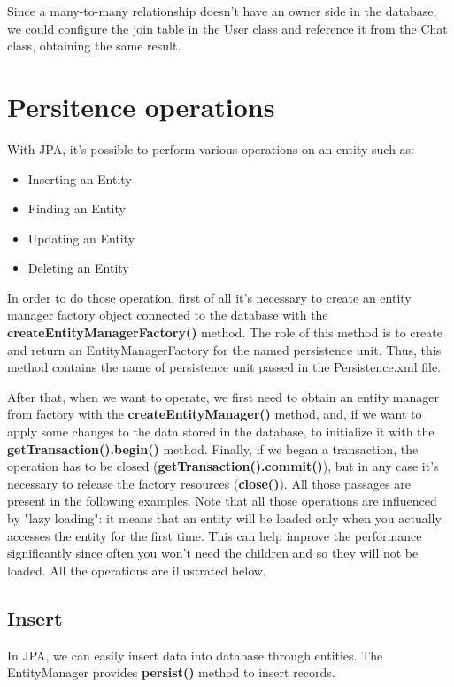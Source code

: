 \documentclass[a4paper]{article}
\begin{document}
Since a many-to-many relationship doesn't have an owner side in the database, we could configure the join table in the User class and reference it from the Chat class, obtaining the same result.

\section{Persitence operations}
With JPA, it's possible to perform various operations on an entity such as:

\begin{itemize}
\item{Inserting an Entity}
\item{Finding an Entity}
\item{Updating an Entity}
\item{Deleting an Entity}
\end{itemize}

In order to do those operation, first of all it's necessary to create an entity manager factory object connected to the database with the \textbf{createEntityManagerFactory()} method. The role of this method is to create and return an EntityManagerFactory for the named persistence unit. Thus, this method contains the name of persistence unit passed in the Persistence.xml file.


After that, when we want to operate, we first need to obtain an entity manager from factory with the \textbf{createEntityManager()} method, and, if we want to apply some changes to the data stored in the database, to initialize it with the \textbf{getTransaction().begin()} method. Finally, if we began a transaction, the operation has to be closed (\textbf{getTransaction().commit()}), but in any case it's necessary to release the factory resources (\textbf{close()}).
All those passages are present in the following examples.
Note that all those operations are influenced by "lazy loading": it means that an entity will be loaded only when you actually accesses the entity for the first time. This can help improve the performance significantly since often you won't need the children and so they will not be loaded.
All the operations are illustrated below.

\subsection{Insert}
In JPA, we can easily insert data into database through entities. The EntityManager provides \textbf{persist()} method to insert records.
\end{document}
